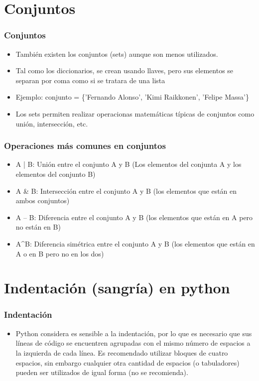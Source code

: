\documentclass[hyperref={pdfpagelabels=false},xcolor=pst,pdf,fragile]{beamer}
\begin{document}
\section{Conjuntos}
\begin{frame}
    \frametitle{Conjuntos}
    \pause
    \begin{itemize}
    \item También existen los conjuntos (sets) aunque son menos utilizados.
    \item Tal como los diccionarios, se crean usando llaves, pero sus elementos se separan por coma como si se tratara de una lista
    \item Ejemplo: conjunto = \{'Fernando Alonso', 'Kimi Raikkonen', 'Felipe Massa'\}
    \item Los sets permiten realizar operacionas matemáticas típicas de conjuntos como unión, intersección, etc.
    \end{itemize}
\end{frame}

\begin{frame}
    \frametitle{Operaciones más comunes en conjuntos}
    \pause
    \begin{itemize}
    \item  A | B: Unión entre el conjunto A y B (Los elementos del conjunta A y los elementos del conjunto B)
    \item A \& B: Intersección entre el conjunto A y B (los elementos que están en ambos conjuntos)
    \item A – B: Diferencia entre el conjunto A y B (los elementos que están en A pero no están en B)
    \item A\textasciicircum B: Diferencia simétrica entre el conjunto A y B (los elementos que están en A o en B pero no en los dos)
    \end{itemize}
\end{frame}

\section{Indentación (sangría) en python}
\begin{frame}
    \frametitle{Indentación}
    \pause
    \begin{itemize}
    \item Python considera es sensible a la indentación, por lo que es necesario que  sus líneas de código se encuentren agrupadas con el mismo número de espacios a la izquierda de cada línea. Es recomendado utilizar bloques de cuatro espacios, sin embargo cualquier otra cantidad de espacios (o tabuladores) pueden ser utilizados de igual forma (no se recomienda).
    \end{itemize}
\end{frame}
\end{document}
